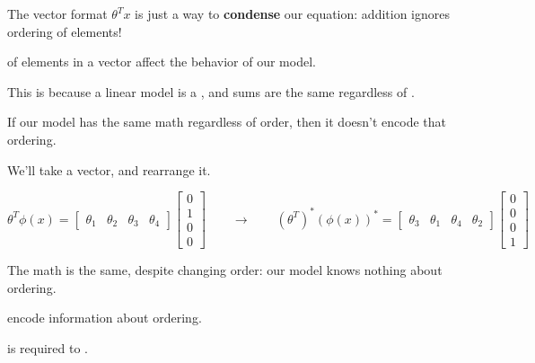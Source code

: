                 The vector format $\theta^Tx$ is just a way to \textbf{condense} our equation: addition ignores ordering of elements!\\

                \begin{concept}
                     of elements in a vector  affect the behavior of our model.

                    This is because a linear model is a , and sums are the same regardless of .
                \end{concept}

                If our model has the same math regardless of order, then it doesn't encode that ordering.

                \miniex We'll take a vector, and rearrange it.

                \begin{equation*}
                    \theta^T \phi(x) = 
                    \begin{bmatrix}
                        \theta_1 & \theta_2 & \theta_3 & \theta_4
                    \end{bmatrix}
                    \begin{bmatrix}
                        0\\1\\0\\0
                    \end{bmatrix}
                    \qquad\longrightarrow\qquad
                    (\theta^T)^* (\phi(x))^* = 
                    \begin{bmatrix}
                        \theta_3 & \theta_1 & \theta_4 & \theta_2
                    \end{bmatrix}
                    \begin{bmatrix}
                        0 \\ 0 \\ 0 \\ 1
                    \end{bmatrix}
                \end{equation*}

                The math is the same, despite changing order: our model knows nothing about ordering.\\

                \begin{clarification}
                      encode information about ordering.

                     is required to .
                \end{clarification}

